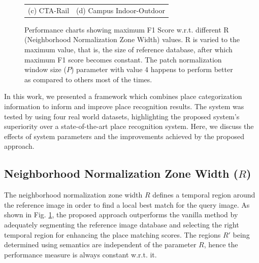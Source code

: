 \documentclass[letterpaper, 10 pt, conference]{ieeeconf}  %
\begin{document}
\begin{figure}
\begin{tabular*}{\textwidth}[t]{cc}
(c) CTA-Rail & (d) Campus Indoor-Outdoor \\
 \end{tabular*}
 \caption{Performance charts showing maximum F1 Score w.r.t. different R (Neighborhood Normalization Zone Width) values. R is varied to the maximum value, that is, the size of reference database, after which maximum F1 score becomes constant. The patch normalization window size ($P$) parameter with value 4 happens to perform better as compared to others most of the times.}
 \label{fig:performanceChart}
\end{figure}


In this work, we presented a framework which combines place categorization information to inform and improve place recognition results. The system was tested by using four real world datasets, highlighting the proposed system's superiority over a state-of-the-art place recognition system. Here, we discuss the effects of system parameters and the improvements achieved by the proposed approach.

\subsection{Neighborhood Normalization Zone Width ($R$)}
The neighborhood normalization zone width $R$ defines a temporal region around the reference image in order to find a local best match for the query image. As shown in Fig. \ref{fig:performanceChart}, the proposed approach outperforms the vanilla method by adequately segmenting the reference image database and selecting the right temporal region for enhancing the place matching scores. The regions $R'$ being determined using semantics are independent of the parameter $R$, hence the performance measure is always constant w.r.t. it.
\end{document}
